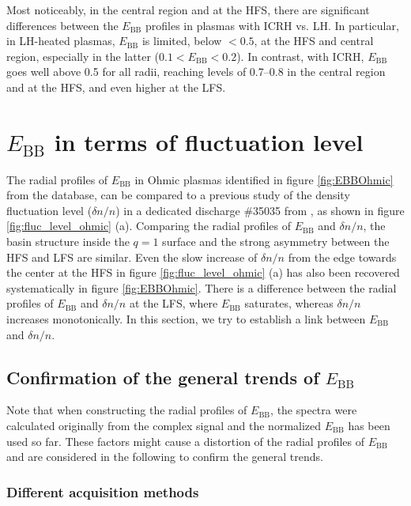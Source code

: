 Most noticeably, in the central region and at the HFS, there are significant differences between the $E_\mathrm{BB}$ profiles in plasmas with ICRH vs. LH. In particular, in LH-heated plasmas, $E_\mathrm{BB}$ is limited, below $< 0.5$, at the HFS and central region, especially in the latter ($0.1 < E_\mathrm{BB} < 0.2$). In contrast, with ICRH, $E_\mathrm{BB}$ goes well above 0.5 for all radii, reaching levels of 0.7--0.8 in the central region and at the HFS, and even higher at the LFS.


\section{$E_\mathrm{BB}$ in terms of fluctuation level} \label{sec:EBB2dn}

The radial profiles of $E_\mathrm{BB}$ in Ohmic plasmas identified in figure \ref{fig:EBBOhmic} from the database, can be compared to a previous study of the density fluctuation level ($\delta n/n$) in a dedicated discharge \#35035 from \cite{Sabot_2006_PPCF}, as shown in figure \ref{fig:fluc_level_ohmic} (a). Comparing the radial profiles of $E_\mathrm{BB}$ and $\delta n/n$, the basin structure inside the $q = 1$ surface and the strong asymmetry between the HFS and LFS are similar. Even the slow increase of $\delta n/n$ from the edge towards the center at the HFS in figure \ref{fig:fluc_level_ohmic} (a) has also been recovered systematically in figure \ref{fig:EBBOhmic}. There is a difference between the radial profiles of $E_\mathrm{BB}$ and $\delta n/n$ at the LFS, where $E_\mathrm{BB}$ saturates, whereas $\delta n/n$ increases monotonically. In this section, we try to establish a link between $E_\mathrm{BB}$ and $\delta n/n$.


\subsection{Confirmation of the general trends of $E_\mathrm{BB}$}

Note that when constructing the radial profiles of $E_\mathrm{BB}$, the spectra were calculated originally from the complex signal and the normalized $E_\mathrm{BB}$ has been used so far. These factors might cause a distortion of the radial profiles of $E_\mathrm{BB}$ and are considered in the following to confirm the general trends.


\subsubsection{Different acquisition methods}

